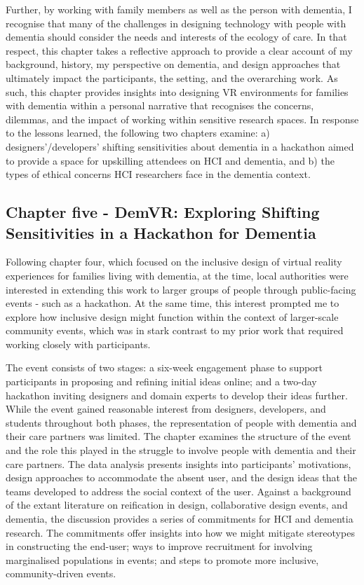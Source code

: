 Further, by working with family members as well as the person with dementia, I recognise that many of the challenges in designing technology with people with dementia should consider the needs and interests of the ecology of care. In that respect, this chapter takes a reflective approach to provide a clear account of my background, history, my perspective on dementia, and design approaches that ultimately impact the participants, the setting, and the overarching work. As such, this chapter provides insights into designing VR environments for families with dementia within a personal narrative that recognises the concerns, dilemmas, and the impact of working within sensitive research spaces. In response to the lessons learned, the following two chapters examine: a) designers'/developers' shifting sensitivities about dementia in a hackathon aimed to provide a space for upskilling attendees on HCI and dementia, and b) the types of ethical concerns HCI researchers face in the dementia context. 

\subsection{Chapter five - DemVR: Exploring Shifting Sensitivities in a Hackathon for Dementia}
\label{Intro:ChapterFive}
Following chapter four, which focused on the inclusive design of virtual reality experiences for families living with dementia, at the time, local authorities were interested in extending this work to larger groups of people through public-facing events - such as a hackathon. At the same time, this interest prompted me to explore how inclusive design might function within the context of larger-scale community events, which was in stark contrast to my prior work that required working closely with participants.

The event consists of two stages: a six-week engagement phase to support participants in proposing and refining initial ideas online; and a two-day hackathon inviting designers and domain experts to develop their ideas further. While the event gained reasonable interest from designers, developers, and students throughout both phases, the representation of people with dementia and their care partners was limited. The chapter examines the structure of the event and the role this played in the struggle to involve people with dementia and their care partners. The data analysis presents insights into participants’ motivations, design approaches to accommodate the absent user, and the design ideas that the teams developed to address the social context of the user. Against a background of the extant literature on reification in design, collaborative design events, and dementia, the discussion provides a series of commitments for HCI and dementia research. The commitments offer insights into how we might mitigate stereotypes in constructing the end-user; ways to improve recruitment for involving marginalised populations in events; and steps to promote more inclusive, community-driven events. 

